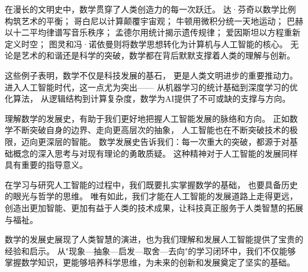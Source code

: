 在漫长的文明史中，数学贯穿了人类创造力的每一次跃迁。  
达·芬奇以数学比例构筑艺术的平衡；  
哥白尼以计算颠覆宇宙观；  
牛顿用微积分统一天地运动；  
巴赫以十二平均律谱写音乐秩序；  
孟德尔用统计揭示遗传规律；  
爱因斯坦以方程重新定义时空；  
图灵和冯·诺依曼则将数学思想转化为计算机与人工智能的核心。  
无论是艺术的和谐还是科学的突破，数学都在背后默默支撑着人类的理解与创新。






这些例子表明，数学不仅是科技发展的基石，  
更是人类文明进步的重要推动力。  
进入人工智能时代，这一点尤为突出——  
从机器学习的统计基础到深度学习的优化算法，  
从逻辑结构到计算复杂度，数学为AI提供了不可或缺的支撑与方向。





理解数学的发展史，有助于我们更好地把握人工智能发展的脉络和方向。  
正如数学不断突破自身的边界、走向更高层次的抽象，  
人工智能也在不断突破技术的极限，迈向更深层的智能。  
数学发展史告诉我们：每一次重大的突破，都源于对基础概念的深入思考与对现有理论的勇敢质疑。  
这种精神对于人工智能的发展同样具有重要的指导意义。




在学习与研究人工智能的过程中，我们既要扎实掌握数学的基础，  
也要具备历史的眼光与哲学的思维。  
唯有如此，我们才能在人工智能的发展道路上走得更远，
创造出更加智能、更加有益于人类的技术成果，让科技真正服务于人类智慧的拓展与福祉。





数学的发展史展现了人类智慧的演进，也为我们理解和发展人工智能提供了宝贵的经验和启示。  
从"现象—抽象—启发—取舍—去向"的学习闭环中，我们不仅能够掌握数学知识，更能够培养科学思维，为未来的创新和发展奠定了坚实的基础。



